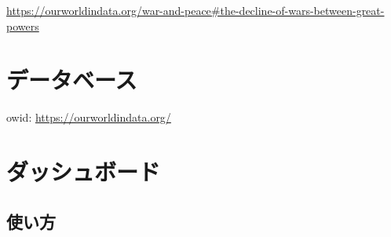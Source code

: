\documentclass[
  xelatex, ja=standard]{bxjsbook}
\theoremstyle{definition}
\theoremstyle{definition}
\theoremstyle{definition}
\theoremstyle{definition}
\theoremstyle{remark}
\begin{document}
\url{https://ourworldindata.org/war-and-peace\#the-decline-of-wars-between-great-powers}

\hypertarget{ux30c7ux30fcux30bfux30d9ux30fcux30b9-3}{%
\section{データベース}\label{ux30c7ux30fcux30bfux30d9ux30fcux30b9-3}}

owid: \url{https://ourworldindata.org/}

\hypertarget{ux30c0ux30c3ux30b7ux30e5ux30dcux30fcux30c9-3}{%
\section{ダッシュボード}\label{ux30c0ux30c3ux30b7ux30e5ux30dcux30fcux30c9-3}}

\hypertarget{ux4f7fux3044ux65b9-1}{%
\subsection{使い方}\label{ux4f7fux3044ux65b9-1}}
\end{document}
